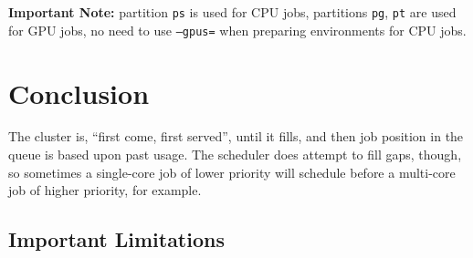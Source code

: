 \documentclass{easychair}
\begin{document}
\noindent
\textbf{Important Note:} partition \texttt{ps} is used for CPU jobs, partitions \texttt{pg}, \texttt{pt} are used
for GPU jobs, no need to use \texttt{--gpus=} when preparing environments for CPU jobs.



\section{Conclusion}
\label{sect:conclusion}

The cluster is, ``first come, first served'', until it fills, and then job
position in the queue is based upon past usage. The scheduler does attempt
to fill gaps, though, so sometimes a single-core job of lower priority
will schedule before a multi-core job of higher priority, for example.

\subsection{Important Limitations}
\label{sect:limitations}
\end{document}
